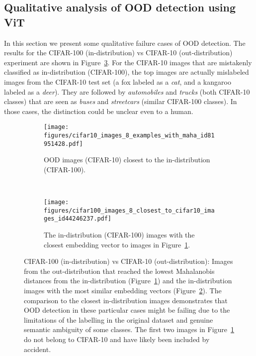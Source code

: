 \documentclass{article}
\begin{document}
\subsection{Qualitative analysis of OOD detection using ViT}\label{app:failure:cases}

In this section we present some qualitative failure cases of OOD detection. The results for the CIFAR-100 (in-distribution) vs CIFAR-10 (out-distribution) experiment are shown in Figure~\ref{fig:mistakes_cifar100tocifar10}. For the CIFAR-10 images that are mistakenly classified as in-distribution (CIFAR-100), the top images are actually mislabeled images from the CIFAR-10 test set (a fox labeled as a \textit{cat}, and a kangaroo labeled as a \textit{deer}). They are followed by \textit{automobiles} and \textit{trucks} (both CIFAR-10 classes) that are seen as \textit{buses} and \textit{streetcars} (similar CIFAR-100 classes). In those cases, the distinction could be unclear even to a human.  
\begin{figure}[ht]
	\centering

 \begin{subfigure}[h]{1.0\textwidth}{ 	\texttt{[image: figures/cifar10\_images\_8\_examples\_with\_maha\_id81951428.pdf]}
          \caption{OOD images (CIFAR-10) closest to the in-distribution (CIFAR-100).
          }
         \label{fig:cifar10_mistaken_as_cifar100}
 }\end{subfigure}
\\ \begin{subfigure}[h]{1.0\textwidth}{ 	\texttt{[image: figures/cifar100\_images\_8\_closest\_to\_cifar10\_images\_id44246237.pdf]}
          \caption{The in-distribution (CIFAR-100) images with the closest embedding vector to images in Figure~\ref{fig:cifar10_mistaken_as_cifar100}.
          }
         \label{fig:similar_cifar100_to_cifar10}
 }\end{subfigure}
\caption{CIFAR-100 (in-distribution) vs CIFAR-10 (out-distribution): Images from the out-distribution that reached the lowest Mahalanobis distances from the in-distribution (Figure~\ref{fig:cifar10_mistaken_as_cifar100}) and the in-distribution images with the most similar embedding vectors (Figure~\ref{fig:similar_cifar100_to_cifar10}). The comparison to the closest in-distribution images demonstrates that OOD detection in these particular cases might be failing due to the limitations of the labelling in the original dataset and genuine semantic ambiguity of some classes. The first two images in Figure~\ref{fig:cifar10_mistaken_as_cifar100} do not belong to CIFAR-10 and have likely been included by accident. 
}
	\vspace{-1em}
	\label{fig:mistakes_cifar100tocifar10}
\end{figure}
\end{document}

